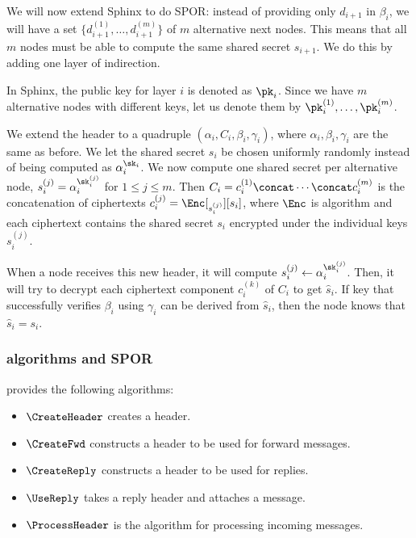 We will now extend \ac{Sphinx} to do \ac{SPOR}: instead of providing only \(d_{i+1}\) 
in \(\beta_i\), we will have a set \(\{d_{i+1}^{(1)}, \dotsc, d_{i+1}^{(m)}\}\) 
of \(m\) alternative next nodes.
This means that all \(m\) nodes must be able to compute the same shared secret 
\(s_{i+1}\).
We do this by adding one layer of indirection.

In \ac{Sphinx}, the public key for layer \(i\) is denoted as \(\pk_i\).
Since we have \(m\) alternative nodes with different keys, let us denote them 
by \(\pk_i^{(1)}, \dotsc, \pk_i^{(m)}\).

We extend the header to a quadruple \((\alpha_i, C_i, \beta_i, \gamma_i)\), 
where \(\alpha_i, \beta_i, \gamma_i\) are the same as before.
We let the shared secret \(s_i\) be chosen uniformly randomly instead of being 
computed as \(\alpha_i^{\sk_i}\).
We now compute one shared secret per alternative node, \ie \(s_i^{(j)} = 
  \alpha_i^{\sk_i^{(j)}}\) for \(1\leq j\leq m\).
Then \(C_i = c_i^{(1)}\concat \dotsb\concat c_i^{(m)}\) is the concatenation of 
ciphertexts \(c_i^{(j)} = \Enc[_{s_i^{(j)}}][s_i]\), where \(\Enc\) is 
 algorithm and each ciphertext contains the shared secret \(s_i\) 
encrypted under the individual keys \(s_i^{(j)}\). 

When a node receives this new header, it will compute \(s_i^{(j)}\gets 
  \alpha_i^{\sk_i^{(j)}}\).
Then, it will try to decrypt each ciphertext component \(c_i^{(k)}\) of \(C_i\) 
to get \(\hat s_i\).
If  key that successfully verifies \(\beta_i\) using \(\gamma_i\) can 
be derived from \(\hat s_i\), then the node knows that \(\hat s_i = s_i\).


\subsubsection{\Sphinxes algorithms and \acf*{SPOR}}

\Sphinxes provides the following algorithms:
\begin{itemize}
  \item \(\CreateHeader\) creates a header.

  \item \(\CreateFwd\) constructs a header to be used for forward messages.

  \item \(\CreateReply\) constructs a header to be used for replies.

  \item \(\UseReply\) takes a reply header and attaches a message.

  \item \(\ProcessHeader\) is the algorithm for processing incoming messages.
\end{itemize}

